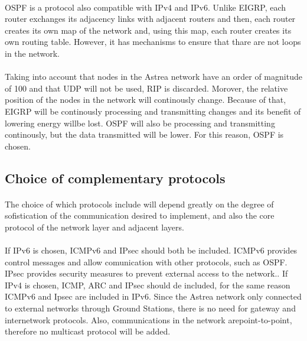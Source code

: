 \documentclass[12pt,a4paper]{report}
\begin{document}
\paragraph{}OSPF is a protocol also compatible with IPv4 and IPv6. Unlike EIGRP, each router exchanges its adjacency links with adjacent routers and then, each router creates its own map of the network and, using this map, each router creates its own routing table. However, it has mechanisms to ensure that thare are not loops in the network.
\paragraph{}Taking into account that nodes in the Astrea network have an order of magnitude of 100 and that UDP will not be used, RIP is discarded. Morover, the relative position of the nodes in the network will continously change. Because of that, EIGRP will be continously processing and transmitting changes and its benefit of lowering energy willbe lost. OSPF will also be processing and transmitting continously, but the data transmitted will be lower. For this reason, OSPF is chosen.

\subsection{Choice of complementary protocols}
\paragraph{}The choice of which protocols include will depend greatly on the degree of sofistication of the communication desired to implement, and also the core protocol of the network layer and adjacent layers.
\paragraph{}If IPv6 is chosen, ICMPv6 and IPsec should both be included. ICMPv6 provides control messages and allow comunication with other protocols, such as OSPF. IPsec provides security measures to prevent external access to the network.. If IPv4 is chosen, ICMP, ARC and IPsec should de included, for the same reason ICMPv6 and Ipsec are included in IPv6. Since the Astrea network only connected to external networks through Ground Stations, there is no need for gateway and internetwork protocols. Also, communications in the network arepoint-to-point, therefore no multicast protocol will be added.
\end{document}
